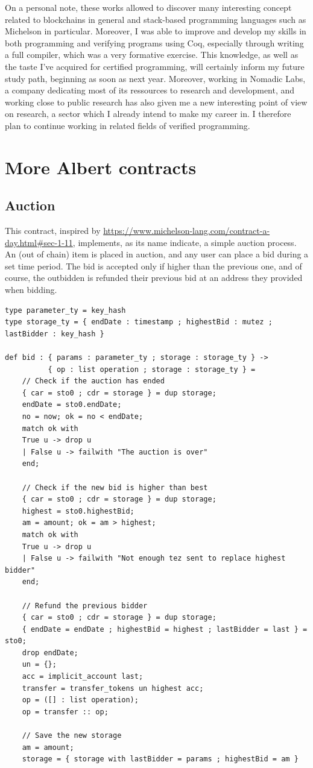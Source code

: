 \documentclass{report}
\begin{document}
On a personal note, these works allowed to discover many interesting concept related to blockchains in general and stack-based programming languages such as Michelson in particular. Moreover, I was able to improve and develop my skills in both programming and verifying programs using Coq, especially through writing a full compiler, which was a very formative exercise. This knowledge, as well as the taste I've acquired for certified programming, will certainly inform my future study path, beginning as soon as next year. Moreover, working in Nomadic Labs, a company dedicating most of its ressources to research and development, and working close to public research has also given me a new interesting point of view on research, a sector which I already intend to make my career in. I therefore plan to continue working in related fields of verified programming.

\appendix

\chapter{More Albert contracts}

\section{Auction}

This contract, inspired by \url{https://www.michelson-lang.com/contract-a-day.html#sec-1-11}, implements, as its name indicate, a simple auction process. An (out of chain) item is placed in auction, and any user can place a bid during a set time period. The bid is accepted only if higher than the previous one, and of course, the outbidden is refunded their previous bid at an address they provided when bidding.

\begin{lstlisting}
type parameter_ty = key_hash
type storage_ty = { endDate : timestamp ; highestBid : mutez ; lastBidder : key_hash }

def bid : { params : parameter_ty ; storage : storage_ty } ->
          { op : list operation ; storage : storage_ty } =
    // Check if the auction has ended
    { car = sto0 ; cdr = storage } = dup storage;
    endDate = sto0.endDate;
    no = now; ok = no < endDate;
    match ok with
    True u -> drop u
    | False u -> failwith "The auction is over"
    end;

    // Check if the new bid is higher than best
    { car = sto0 ; cdr = storage } = dup storage;
    highest = sto0.highestBid;
    am = amount; ok = am > highest;
    match ok with
    True u -> drop u
    | False u -> failwith "Not enough tez sent to replace highest bidder"
    end;

    // Refund the previous bidder
    { car = sto0 ; cdr = storage } = dup storage;
    { endDate = endDate ; highestBid = highest ; lastBidder = last } = sto0;
    drop endDate;
    un = {};
    acc = implicit_account last;
    transfer = transfer_tokens un highest acc;
    op = ([] : list operation);
    op = transfer :: op;

    // Save the new storage
    am = amount;
    storage = { storage with lastBidder = params ; highestBid = am }
\end{lstlisting}
\end{document}
